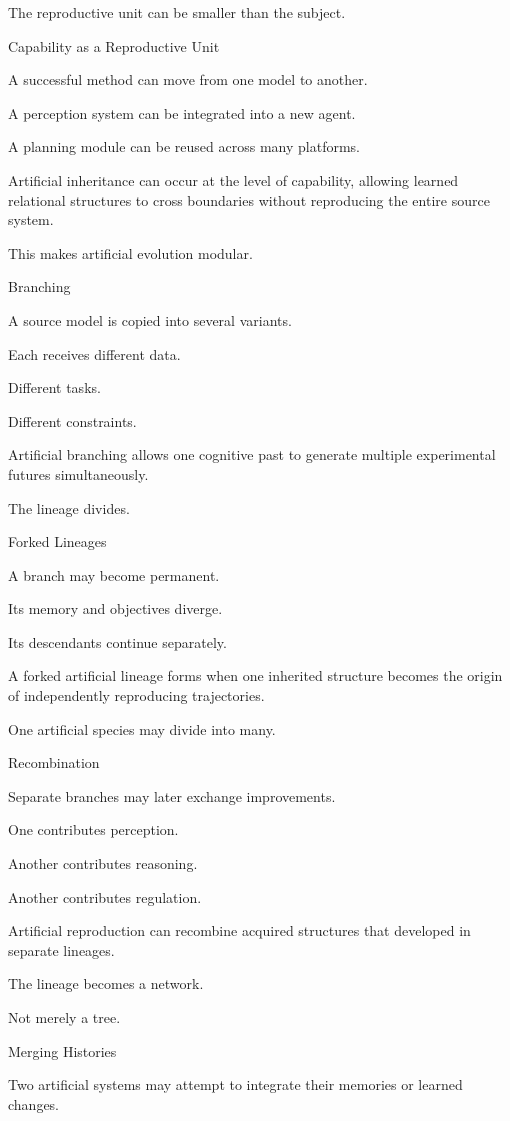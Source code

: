 The reproductive unit can be smaller than the subject.

Capability as a Reproductive Unit

A successful method can move from one model to another.

A perception system can be integrated into a new agent.

A planning module can be reused across many platforms.

Artificial inheritance can occur at the level of capability, allowing learned relational structures to cross boundaries without reproducing the entire source system.

This makes artificial evolution modular.

Branching

A source model is copied into several variants.

Each receives different data.

Different tasks.

Different constraints.

Artificial branching allows one cognitive past to generate multiple experimental futures simultaneously.

The lineage divides.

Forked Lineages

A branch may become permanent.

Its memory and objectives diverge.

Its descendants continue separately.

A forked artificial lineage forms when one inherited structure becomes the origin of independently reproducing trajectories.

One artificial species may divide into many.

Recombination

Separate branches may later exchange improvements.

One contributes perception.

Another contributes reasoning.

Another contributes regulation.

Artificial reproduction can recombine acquired structures that developed in separate lineages.

The lineage becomes a network.

Not merely a tree.

Merging Histories

Two artificial systems may attempt to integrate their memories or learned changes.

